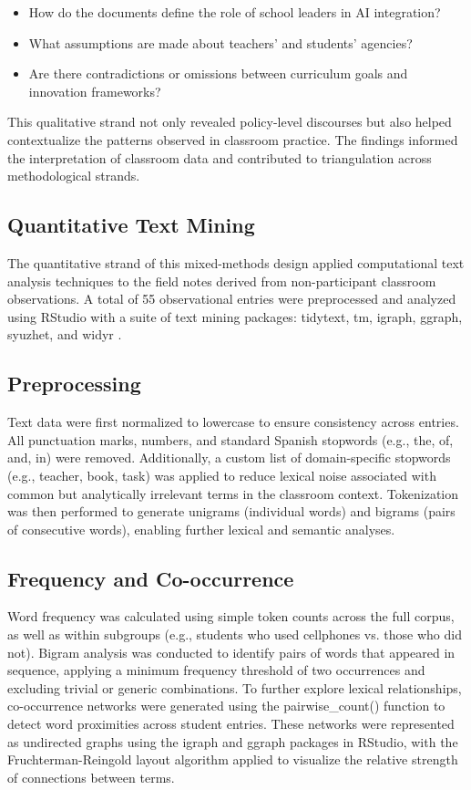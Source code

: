 \documentclass[english]{textolivre}
\begin{document}
\begin{itemize}
    \item How do the documents define the role of school leaders in AI integration?
    \item What assumptions are made about teachers’ and students’ agencies?
    \item Are there contradictions or omissions between curriculum goals and innovation frameworks?
\end{itemize}
    
This qualitative strand not only revealed policy-level discourses but also helped contextualize the patterns observed in classroom practice. The findings informed the interpretation of classroom data and contributed to triangulation across methodological strands.

\subsection{Quantitative Text Mining}
The quantitative strand of this mixed-methods design applied computational text analysis techniques to the field notes derived from non-participant classroom observations. A total of 55 observational entries were preprocessed and analyzed using RStudio with a suite of text mining packages: tidytext, tm, igraph, ggraph, syuzhet, and widyr \cite{silge2017text,jockers2017syuzhet}.

\subsection{Preprocessing}
Text data were first normalized to lowercase to ensure consistency across entries. All punctuation marks, numbers, and standard Spanish stopwords (e.g., the, of, and, in) were removed. Additionally, a custom list of domain-specific stopwords (e.g., teacher, book, task) was applied to reduce lexical noise associated with common but analytically irrelevant terms in the classroom context. Tokenization was then performed to generate unigrams (individual words) and bigrams (pairs of consecutive words), enabling further lexical and semantic analyses.

\subsection{Frequency and Co-occurrence}
Word frequency was calculated using simple token counts across the full corpus, as well as within subgroups (e.g., students who used cellphones vs. those who did not). Bigram analysis was conducted to identify pairs of words that appeared in sequence, applying a minimum frequency threshold of two occurrences and excluding trivial or generic combinations. To further explore lexical relationships, co-occurrence networks were generated using the pairwise\_count() function to detect word proximities across student entries. These networks were represented as undirected graphs using the igraph and ggraph packages in RStudio, with the Fruchterman-Reingold layout algorithm applied to visualize the relative strength of connections between terms.
\end{document}
